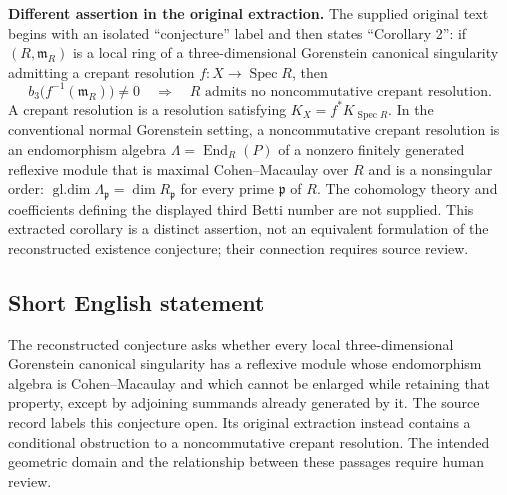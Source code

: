 \documentclass[11pt]{article}
\begin{document}
\textbf{Different assertion in the original extraction.} The supplied original text begins with an isolated ``conjecture'' label and then states ``Corollary 2'': if \((R,\mathfrak m_R)\) is a local ring of a three-dimensional Gorenstein canonical singularity admitting a crepant resolution \(f\colon X\to\operatorname{Spec}R\), then
\[
b_3\bigl(f^{-1}(\mathfrak m_R)\bigr)\ne 0
\quad\Longrightarrow\quad
R\text{ admits no noncommutative crepant resolution}.
\]
A crepant resolution is a resolution satisfying \(K_X=f^*K_{\operatorname{Spec}R}\). In the conventional normal Gorenstein setting, a noncommutative crepant resolution is an endomorphism algebra \(\Lambda=\operatorname{End}_R(P)\) of a nonzero finitely generated reflexive module that is maximal Cohen--Macaulay over \(R\) and is a nonsingular order: \(\operatorname{gl.dim}\Lambda_{\mathfrak p}=\dim R_{\mathfrak p}\) for every prime \(\mathfrak p\) of \(R\). The cohomology theory and coefficients defining the displayed third Betti number are not supplied. This extracted corollary is a distinct assertion, not an equivalent formulation of the reconstructed existence conjecture; their connection requires source review.
\subsection{Short English statement}
The reconstructed conjecture asks whether every local three-dimensional Gorenstein canonical singularity has a reflexive module whose endomorphism algebra is Cohen--Macaulay and which cannot be enlarged while retaining that property, except by adjoining summands already generated by it. The source record labels this conjecture open. Its original extraction instead contains a conditional obstruction to a noncommutative crepant resolution. The intended geometric domain and the relationship between these passages require human review.
\end{document}

